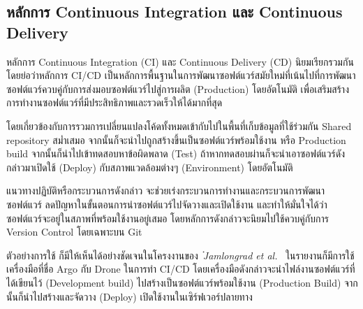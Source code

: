 \documentclass[12pt,one side,openright,a4paper]{cpe-thesis-th}
\newcommand{\thaijustify}[1]{%
  \par\hspace{30pt}\justifying
  #1
}
\begin{document}
    \subsection{หลักการ Continuous Integration และ Continuous Delivery}
        \thaijustify{
            หลักการ Continuous Integration (CI) และ Continuous Delivery (CD) นิยมเรียกรวมกันโดยย่อว่าหลักการ CI/CD เป็นหลักการพื้นฐานในการพัฒนาซอฟต์แวร์สมัยใหม่ที่เน้นไปที่การพัฒนาซอฟต์แวร์ควบคู่กับการส่งมอบซอฟต์แวร์ไปสู่การผลิต (Production) โดยอัตโนมัติ เพื่อเสริมสร้างการทำงานซอฟต์แวร์ที่มีประสิทธิภาพและรวดเร็วให้ได้มากที่สุด
        }
        \thaijustify{
            โดยเกี่ยวข้องกับการรวมการเปลี่ยนแปลงโค้ดทั้งหมดเข้ากับไปในพื้นที่เก็บข้อมูลที่ใช้ร่วมกัน Shared repository สม่ำเสมอ จากนั้นก็จะนำไปถูกสร้างขึ้นเป็นซอฟต์แวร์พร้อมใช้งาน หรือ Production build จากนั้นก็นำไปเข้าทดสอบหาข้อผิดพลาด (Test) ถ้าหากทดสอบผ่านก็จะนำเอาซอฟต์แวร์ดังกล่าวมาเปิดใช้ (Deploy) กับสภาพแวดล้อมต่างๆ (Environment) โดยอัตโนมัติ~\cite{fowlerCI}
        }
        \thaijustify{
            แนวทางปฏิบัติหรือกระบวนการดังกล่าว จะช่วยเร่งกระบวนการทำงานและกระบวนการพัฒนาซอฟต์แวร์ ลดปัญหาในขั้นตอนการนำซอฟต์แวร์ไปจัดวางและเปิดใช้งาน และทำให้มั่นใจได้ว่าซอฟต์แวร์จะอยู่ในสภาพที่พร้อมใช้งานอยู่เสมอ โดยหลักการดังกล่าวจะนิยมไปใช้ควบคู่กับการ Version Control โดยเฉพาะบน Git
        }
        \thaijustify{
            ตัวอย่างการใช้ ก็มีให้เห็นได้อย่างชัดเจนในโครงงานของ~\textit{๋Jamlongrad et al.}~\cite{nattawat20pgs} ในรายงานก็มีการใช้เครื่องมือที่ชื่อ Argo กับ Drone ในการทำ CI/CD โดยเครื่องมือดังกล่าวจะนำไฟล์งานซอฟต์แวร์ที่ได้เขียนไว้ (Development build) ไปสร้างเป็นซอฟต์แวร์พร้อมใช้งาน (Production Build) จากนั้นก็นำไปสร้างและจัดวาง (Deploy) เปิดใช้งานในเซิร์ฟเวอร์ปลายทาง
        }
\end{document}
